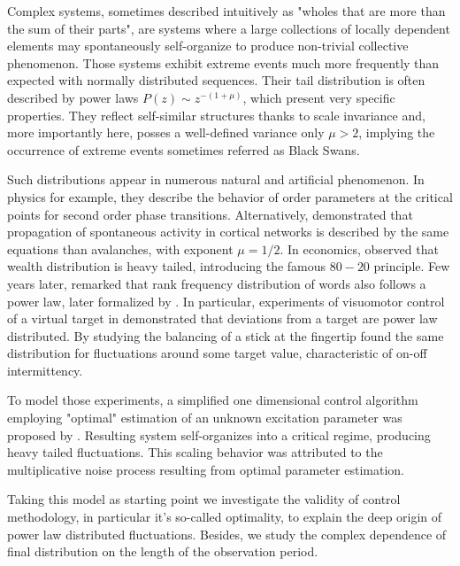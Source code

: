 \documentclass[FinalReport.tex]{subfiles}
\begin{document}
Complex systems, sometimes described intuitively as "wholes that are more than the sum of their parts", are systems where a large collections of locally dependent elements may spontaneously self-organize to produce non-trivial collective phenomenon. Those systems exhibit extreme events much more frequently than expected with normally distributed sequences. Their tail distribution is often described by power laws $P(z)\sim z^{-(1+\mu)}$, which present very specific properties. They reflect self-similar structures thanks to scale invariance and, more importantly here, posses a well-defined variance only $\mu>2$, implying the occurrence of extreme events sometimes referred as Black Swans.

Such distributions appear in numerous natural and artificial phenomenon. In physics for example, they describe the behavior of order parameters at the critical points for second order phase transitions. Alternatively, \citet{Beggs} demonstrated that propagation of spontaneous activity in cortical networks is described by the same equations than avalanches, with exponent $\mu=1/2$. In economics, \citet{pareto} observed that wealth distribution is heavy tailed, introducing the famous $80-20$ principle. Few years later, \citet{estoup1916} remarked that rank frequency distribution of words also follows a power law, later formalized by \citet{zipf}. In particular, experiments of visuomotor control of a virtual target in \citet{Bormann} demonstrated that deviations from a target are power law distributed. By studying the balancing of a stick at the fingertip \citet{on-off-balancing} found the same distribution for fluctuations around some target value, characteristic of on-off intermittency. 

To model those experiments, a simplified one dimensional control algorithm employing "optimal" estimation of an unknown excitation parameter was proposed by \citet{OptCont}. Resulting system self-organizes into a critical regime, producing heavy tailed fluctuations. This scaling behavior was attributed to the multiplicative noise process resulting from optimal parameter estimation.  
 
Taking this model as starting point we investigate the validity of control methodology, in particular it's so-called optimality, to explain the deep origin of power law distributed fluctuations. Besides, we study the complex dependence of final distribution on the length of the observation period. 
\end{document}
